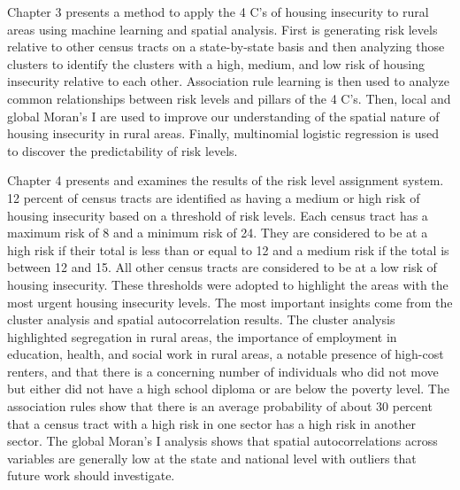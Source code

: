 Chapter 3 presents a method to apply the 4 C's of housing insecurity to rural areas using machine learning and spatial analysis. First is generating risk levels relative to other census tracts on a state-by-state basis and then analyzing those clusters to identify the clusters with a high, medium, and low risk of housing insecurity relative to each other. Association rule learning is then used to analyze common relationships between risk levels and pillars of the 4 C's. Then, local and global Moran's I are used to improve our understanding of the spatial nature of housing insecurity in rural areas. Finally, multinomial logistic regression is used to discover the predictability of risk levels. 

Chapter 4 presents and examines the results of the risk level assignment system. 12 percent of census tracts are identified as having a medium or high risk of housing insecurity based on a threshold of risk levels. Each census tract has a maximum risk of 8 and a minimum risk of 24. They are considered to be at a high risk if their total is less than or equal to 12 and a medium risk if the total is between 12 and 15. All other census tracts are considered to be at a low risk of housing insecurity. These thresholds were adopted to highlight the areas with the most urgent housing insecurity levels. The most important insights come from the cluster analysis and spatial autocorrelation results. The cluster analysis highlighted segregation in rural areas, the importance of employment in education, health, and social work in rural areas, a notable presence of high-cost renters, and that there is a concerning number of individuals who did not move but either did not have a high school diploma or are below the poverty level. The association rules show that there is an average probability of about 30 percent that a census tract with a high risk in one sector has a high risk in another sector. The global Moran's I analysis shows that spatial autocorrelations across variables are generally low at the state and national level with outliers that future work should investigate. 

